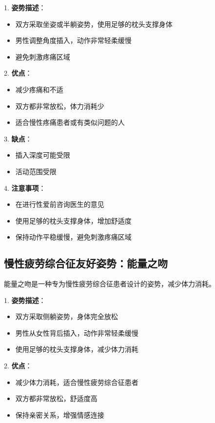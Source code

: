 \documentclass[12pt,UTF8]{ctexbook}
\begin{document}
1. \textbf{姿势描述}：
  \begin{itemize}
  \item 双方采取坐姿或半躺姿势，使用足够的枕头支撑身体
  \item 男性调整角度插入，动作非常轻柔缓慢
  \item 避免刺激疼痛区域
  \end{itemize}

2. \textbf{优点}：
  \begin{itemize}
  \item 减少疼痛和不适
  \item 双方都非常放松，体力消耗少
  \item 适合慢性疼痛患者或有类似问题的人
  \end{itemize}

3. \textbf{缺点}：
  \begin{itemize}
  \item 插入深度可能受限
  \item 活动范围受限
  \end{itemize}

4. \textbf{注意事项}：
  \begin{itemize}
  \item 在进行性爱前咨询医生的意见
  \item 使用足够的枕头支撑身体，增加舒适度
  \item 保持动作平稳缓慢，避免刺激疼痛区域
  \end{itemize}

\subsection{慢性疲劳综合征友好姿势：能量之吻}

能量之吻是一种专为慢性疲劳综合征患者设计的姿势，减少体力消耗。

1. \textbf{姿势描述}：
  \begin{itemize}
  \item 双方采取侧躺姿势，身体完全放松
  \item 男性从女性背后插入，动作非常轻柔缓慢
  \item 使用足够的枕头支撑身体，减少体力消耗
  \end{itemize}

2. \textbf{优点}：
  \begin{itemize}
  \item 减少体力消耗，适合慢性疲劳综合征患者
  \item 双方都非常放松，舒适度高
  \item 保持亲密关系，增强情感连接
  \end{itemize}
\end{document}
